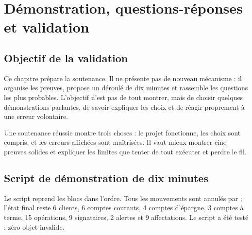 \chapter{Démonstration, questions-réponses et validation}
\label{chap:validation}

\section{Objectif de la validation}

Ce chapitre prépare la soutenance. Il ne présente pas de nouveau mécanisme :
il organise les preuves, propose un déroulé de dix minutes et rassemble les
questions les plus probables. L'objectif n'est pas de tout montrer, mais de
choisir quelques démonstrations parlantes, de savoir expliquer les choix et de
réagir proprement à une erreur volontaire.

\begin{objectifbox}
Une soutenance réussie montre trois choses : le projet fonctionne, les choix
sont compris, et les erreurs affichées sont maîtrisées. Il vaut mieux montrer
cinq preuves solides et expliquer les limites que tenter de tout exécuter et
perdre le fil.
\end{objectifbox}

\section{Script de démonstration de dix minutes}

Le script  reprend les blocs dans l'ordre. Tous les
mouvements sont annulés par  ; l'état final reste 6 clients,
6 comptes courants, 4 comptes d'épargne, 3 comptes à terme, 15 opérations,
9 signataires, 2 alertes et 9 affectations. Le script a été testé : zéro objet
invalide.

